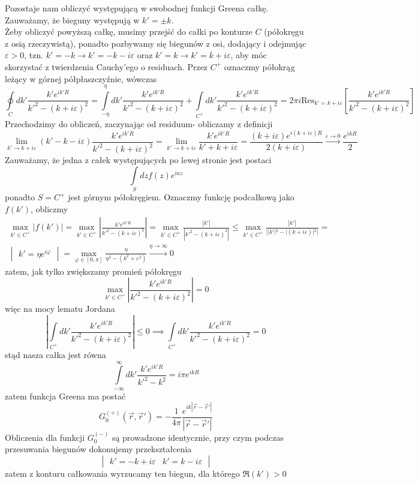 \documentclass[a4paper,12pt]{article}
\begin{document}
    		Pozostaje nam obliczyć występującą w swobodnej funkcji Greena całkę. Zauważamy, że bieguny występują w $k' = \pm k$.\\
    		Żeby obliczyć powyższą całkę, musimy przejść do całki po konturze $C$ (półokręgu z osią rzeczywistą), ponadto pozbywamy się 
    		biegunów z osi, dodający i odejmując $\varepsilon>0$, tzn. $k' = -k \to k' = -k-i\varepsilon$ oraz 
    		$k' = k \to k' = k+i\varepsilon$, aby móc skorzystać z twierdzenia Cauchy'ego o residuach. Przez $C^+$ oznaczmy
    		półokrąg leżący w górnej półpłaszczyźnie, wówczas
    		$$
    			\oint\limits_{C}dk' \frac{k'e^{ik'R}}{k'^2-(k+i\varepsilon)^2} = \int\limits_{-\eta}^\eta dk' \frac{k'e^{ik'R}}{k'^2-(k+i\varepsilon)^2} + 
    			\int\limits_{C^+} dk' \frac{k'e^{ik'R}}{k'^2-(k+i\varepsilon)^2} = 2\pi i \mathrm{Res}_{k'=k+i\varepsilon}\left[\frac{k'e^{ik'R}}{k'^2-(k+i\varepsilon)^2}\right]
    		$$
    		Przechodzimy do obliczeń, zaczynając od residuum- obliczamy z definicji
    		$$
    			\lim\limits_{k'\to k+i\varepsilon} (k'-k-i\varepsilon) \frac{k'e^{ik'R}}{k'^2-(k+i\varepsilon)^2} = \lim\limits_{k'\to k+i\varepsilon} \frac{k'e^{ik'R}}{k'+k+i\varepsilon} =
    			\frac{(k+i\varepsilon)e^{i(k+i\varepsilon)R}}{2(k+i\varepsilon)} \overset{\varepsilon\to 0}{\to} \frac{e^{ikR}}{2}
    		$$
    		Zauważamy, że jedna z całek występujących po lewej stronie jest postaci
    		$$
    			\int\limits_{S}dz f(z) e^{iaz}
    		$$
    		ponadto $S=C^+$ jest górnym półokręgiem. Oznaczmy funkcję podcałkową jako $f(k')$, obliczmy
    		$$
    		\begin{gathered}
    			\max\limits_{k'\in C^+}|f(k')| = \max\limits_{k'\in C^+}\left|\frac{k'e^{ik'R}}{k'^2-(k+i\varepsilon)^2}  \right| 
    			=\max\limits_{k'\in C^+}\frac{|k'|}{|k'^2-(k+i\varepsilon)^2|} \leq \max\limits_{k'\in C^+}\frac{|k'|}{||k'|^2-|(k+i\varepsilon)|^2|} =\\
    			\begin{vmatrix}
    				k' = \eta e^{i\varphi}
    			\end{vmatrix}
    			= \max\limits_{\varphi\in[0,\pi]}\frac{\eta}{\eta^2-(k^2+\varepsilon^2)} \overset{\eta\to \infty}{\to} 0
    		\end{gathered}
    		$$
    		zatem, jak tylko zwiększamy promień półokręgu
    		$$
    			\max\limits_{k'\in C^+} \left|\frac{k'e^{ik'R}}{k'^2-(k+i\varepsilon)^2}\right| = 0
    		$$
    		więc na mocy lematu Jordana 
    		$$
    			\left|\int\limits_{C^+}dk'\frac{k'e^{ik'R}}{k'^2-(k+i\varepsilon)^2}\right| \leq 0 \implies \int\limits_{C^+}dk'\frac{k'e^{ik'R}}{k'^2-(k+i\varepsilon)^2} = 0
    		$$
    		stąd nasza całka jest równa
    		$$
    			\int\limits_{-\infty}^\infty dk' \frac{k'e^{ik'R}}{k'^2-k^2} = i\pi e^{ikR}
    		$$
    		zatem funkcja Greena ma postać
    		$$
    			G_0^{(+)}(\vec{r},\vec{r}') =  -\frac{1}{4\pi}\frac{e^{ik|\vec{r}-\vec{r}'|}}{|\vec{r}-\vec{r}'|}
    		$$
    		Obliczenia dla funkcji $G_0^{(-)}$ są prowadzone identycznie, przy czym podczas przesuwania biegunów dokonujemy przekształcenia
    		$$
    			\begin{vmatrix}
    			k' = -k +i\varepsilon & k' = k-i\varepsilon 
    			\end{vmatrix}
    		$$
    		zatem z konturu całkowania wyrzucamy ten biegun, dla którego $\Re(k')>0$
\end{document}
